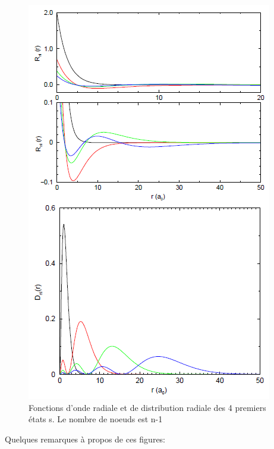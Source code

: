 \begin{figure}[tph]
    \centering
    \includegraphics[scale=0.8]{Images2/ex.PNG}
    \caption{Fonctions d'onde radiale et de distribution radiale des 4 premiers états s. Le nombre de noeuds est n-1}
\end{figure}

Quelques remarques à propos de ces figures: 

